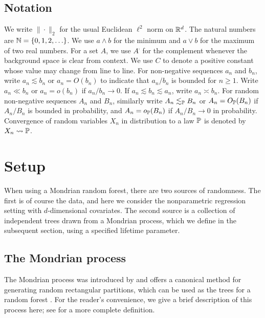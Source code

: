 \subsection{Notation}

We write $\|\cdot\|_2$ for the usual Euclidean $\ell^2$ norm on $\R^d$. The
natural numbers are $\N = \{0, 1, 2, \ldots \}$. We use $a \wedge b$ for the
minimum and $a \vee b$ for the maximum of two real numbers. For a set $A$, we
use $A^{\comp}$ for the complement whenever the background space is clear from
context. We use $C$ to denote a positive constant whose value may change from
line to line. For non-negative sequences $a_n$ and $b_n$, write
$a_n \lesssim b_n$ or $a_n = O(b_n)$ to indicate that $a_n / b_n$ is bounded
for $n\geq 1$. Write $a_n \ll b_n$ or $a_n = o(b_n)$ if $a_n / b_n \to 0$. If
$a_n \lesssim b_n \lesssim a_n$, write $a_n \asymp b_n$. For random
non-negative sequences $A_n$ and $B_n$, similarly write $A_n \lesssim_\P B_n$
or $A_n = O_\P(B_n)$ if $A_n / B_n$ is bounded in probability,
and $A_n = o_\P(B_n)$ if $A_n / B_n \to 0$ in probability. Convergence of
random variables $X_n$ in distribution to a law $\P$ is denoted by
$X_n \rightsquigarrow \P$.

\section{Setup}
\label{sec:mondrian_setup}

When using a Mondrian random forest, there are two sources of randomness. The
first is of course the data, and here we consider the nonparametric regression
setting with $d$-dimensional covariates. The second source is a collection of
independent trees drawn from a Mondrian process, which we define in the
subsequent section, using a specified lifetime parameter.

\subsection{The Mondrian process}
\label{sec:mondrian_process}

The Mondrian process was introduced by \citet{roy2008mondrian} and offers a
canonical method for generating random rectangular partitions, which can be
used as the trees for a random forest
\citep{lakshminarayanan2014mondrian,lakshminarayanan2016mondrian}. For
the reader's convenience, we give a brief description of this process here; see
\citet[Section~3]{mourtada2020minimax} for a more complete definition.

